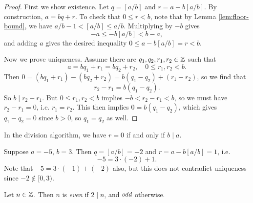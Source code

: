 \begin{proof}
  First we show existence. Let $q = [a / b]$
  and $r = a - b[a / b]$. By construction,
  $a = bq + r$. To check that
  $0 \le r < b$, note that by Lemma
  \ref{lem:floor-bound}, we have
  $a / b - 1 < [a / b] \le a / b$. Multiplying
  by $-b$ gives
  \[
    -a \le -b[a / b] < b - a,
  \]
  and adding $a$ gives the desired inequality
  $0 \le a - b[a / b] = r < b$.

  Now we prove uniqueness. Assume there are
  $q_1, q_2, r_1, r_2 \in \mathbb{Z}$ such that
  \[
    a = bq_1 + r_1 = bq_2 + r_2, \quad
    0 \le r_1, r_2 < b.
  \]
  Then $0 = (bq_1 + r_1) - (bq_2 + r_2) = b(q_1 - q_2) + (r_1 - r_2)$, so we find that
  \[
    r_2 - r_1 = b(q_1 - q_2).
  \]
  So $b \mid r_2 - r_1$. But
  $0 \le r_1, r_2 < b$
  implies $-b < r_2 - r_1 < b$, so
  we must have $r_2 - r_1 = 0$, i.e.
  $r_1 = r_2$. This then implies
  $0 = b(q_1 - q_2)$, which gives
  $q_1 - q_2 = 0$ since $b > 0$, so
  $q_1 = q_2$ as well.
\end{proof}

\begin{remark}
  In the division algorithm, we have $r = 0$
  if and only if $b \mid a$.
\end{remark}

\begin{example}
  Suppose $a = -5$, $b = 3$. Then
  $q = [a / b] = -2$ and
  $r = a - b[a / b] = 1$, i.e.
  \[
    -5 = 3 \cdot (-2) + 1.
  \]
  Note that $-5 = 3 \cdot (-1) + (-2)$ also, but
  this does not contradict uniqueness since
  $-2 \notin [0, 3)$.
\end{example}

\begin{definition}
  Let $n \in \mathbb{Z}$. Then $n$ is \emph{even}
  if $2 \mid n$, and $\emph{odd}$ otherwise.
\end{definition}

